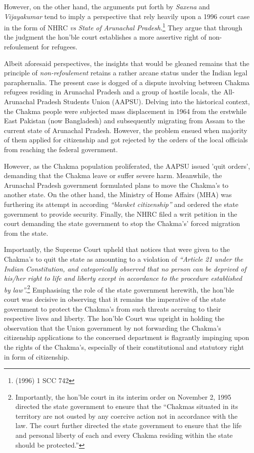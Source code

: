 \begin{multicols}{2}
\vspace{-.15cm}

\noi
However, on the other hand, the arguments put forth by \textit{Saxena} and \textit{Vijayakumar} tend to
imply a perspective that rely heavily upon a 1996 court case in the form of NHRC \textit{vs State of
Arunachal Pradesh.}\footnote{(1996) 1 SCC 742} They argue that through the judgment the hon’ble court establishes a
more assertive right of non-refoulement for refugees.

\noi
Albeit aforesaid perspectives, the insights that would be gleaned remains that the principle of
\textit{non-refoulement} retains a rather arcane status under the Indian legal paraphernalia. The
present case is dogged of a dispute involving between Chakma refugees residing in
Arunachal Pradesh and a group of hostile locals, the All-Arunachal Pradesh Students Union
(AAPSU). Delving into the historical context, the Chakma people were subjected mass
displacement in 1964 from the erstwhile East Pakistan (now Bangladesh) and subsequently
migrating from Assam to the current state of Arunachal Pradesh. However, the problem
ensued when majority of them applied for citizenship and got rejected by the orders of the
local officials from reaching the federal government.

\noi
However, as the Chakma population proliferated, the AAPSU issued 'quit orders', demanding
that the Chakma leave or suffer severe harm. Meanwhile, the Arunachal Pradesh government
formulated plans to move the Chakma’s to another state. On the other hand, the Ministry of
Home Affairs (MHA) was furthering its attempt in according \textit{“blanket citizenship”} and
ordered the state government to provide security. Finally, the NHRC filed a writ petition in
the court demanding the state government to stop the Chakma’s' forced migration from the
state.

\noi
Importantly, the Supreme Court upheld that notices that were given to the Chakma’s to quit
the state as amounting to a violation of \textit{“Article 21 under the Indian Constitution, and
categorically observed that no person can be deprived of his/her right to life and liberty
except in accordance to the procedure established by law”.}\footnote{Importantly, the hon’ble court in its interim order on November 2, 1995 directed the state government to ensure that the “Chakmas situated in its territory are not ousted by any coercive action not in accordance with the law. The court further directed the state government to ensure that the life and personal liberty of each and every Chakma residing within the state should be protected.”} Emphasising the role of the state government herewith, the hon’ble court was decisive in observing that it remains the
imperative of the state government to protect the Chakma’s from such threats accruing to
their respective lives and liberty. The hon’ble Court was upright in holding the observation
that the Union government by not forwarding the Chakma’s citizenship applications to the
concerned department is flagrantly impinging upon the rights of the Chakma’s, especially of
their constitutional and statutory right in form of citizenship.


\end{multicols}
